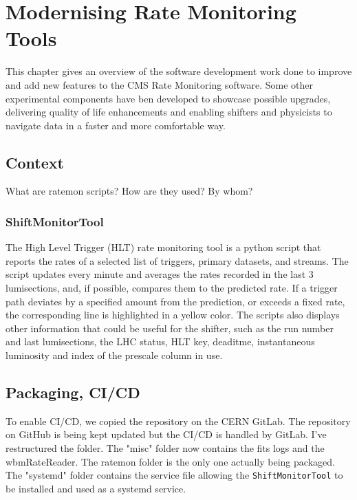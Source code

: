 \chapter{Modernising Rate Monitoring Tools}

This chapter gives an overview of the software development work done to improve and add new features to the CMS Rate Monitoring software. Some other experimental components have ben developed to showcase possible upgrades, delivering quality of life enhancements and enabling shifters and physicists to navigate data in a faster and more comfortable way.

\section{Context}

What are ratemon scripts? How are they used? By whom?

\subsection{ShiftMonitorTool}

The High Level Trigger (HLT) rate monitoring tool is a python script that reports the rates of a selected list of triggers, primary datasets, and streams. The script updates every minute and averages the rates recorded in the last 3 lumisections, and, if possible, compares them to the predicted rate. If a trigger path deviates by a specified amount from the prediction, or exceeds a fixed rate, the corresponding line is highlighted in a yellow color. The scripts also displays other information that could be useful for the shifter, such as the run number and last lumisections, the LHC status, HLT key, deaditme, instantaneous luminosity and index of the prescale column in use.

\section{Packaging, CI/CD}

To enable CI/CD, we copied the repository on the CERN GitLab. The repository on GitHub is being kept updated but the CI/CD is handled by GitLab.
I've restructured the folder. The "misc" folder now contains the fits logs and the wbmRateReader. The ratemon folder is the only one actually being packaged. The "systemd" folder contains the service file allowing the \texttt{ShiftMonitorTool} to be installed and used as a systemd service.

